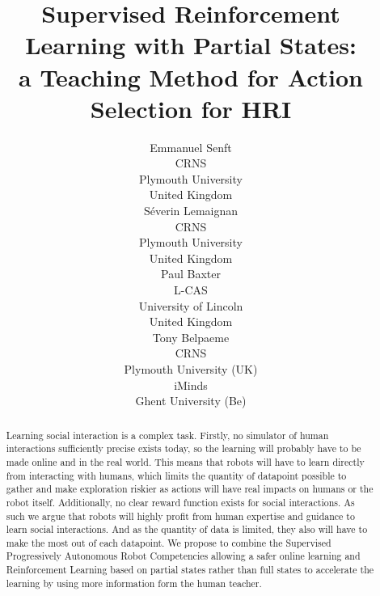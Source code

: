 \documentclass[letterpaper]{article} %
\begin{document}
%
\title{Supervised Reinforcement Learning with Partial States: \\
 a Teaching Method for Action Selection for HRI}

\author{Emmanuel Senft \\
CRNS \\
Plymouth University \\
United Kingdom\\
\And S\'{e}verin Lemaignan\\
CRNS \\
Plymouth University \\
United Kingdom\\
\And Paul Baxter\\
L-CAS\\
University of Lincoln\\
United Kingdom\\
 \And Tony Belpaeme\\
 CRNS\\ Plymouth University (UK) \\ iMinds \\ Ghent University (Be)}

\maketitle
\begin{abstract}
Learning social interaction is a complex task. Firstly, no simulator of
human interactions sufficiently precise exists today, so the learning will probably have
to be made online and in the real world.
This means that robots will have to learn directly from interacting with humans,
which limits the quantity of datapoint possible to gather and make exploration
riskier as actions will have real impacts on humans or the robot itself. Additionally,
no clear reward function exists for social interactions. As such we argue that
robots will highly profit from human expertise and guidance to learn social
interactions. And as the quantity of data is limited, they also will have to make the most out of each datapoint. We
propose to combine the Supervised Progressively Autonomous Robot Competencies
allowing a safer online learning and Reinforcement Learning based on partial
states rather than full states to accelerate the learning by using more
information form the human teacher.
\end{abstract}
\end{document}

